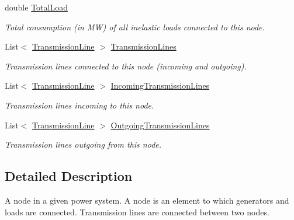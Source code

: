 \begin{DoxyCompactItemize}
double \hyperlink{class_power_system_planning_1_1_node_a5ad80ac9ed391e904c9cf4011c7ba00d}{Total\+Load}
\begin{DoxyCompactList}\small\item\em Total consumption (in MW) of all inelastic loads connected to this node. \end{DoxyCompactList}\item 
List$<$ \hyperlink{class_power_system_planning_1_1_transmission_line}{Transmission\+Line} $>$ \hyperlink{class_power_system_planning_1_1_node_a99a60d0b8c6efda899676fd86417162f}{Transmission\+Lines}
\begin{DoxyCompactList}\small\item\em Transmission lines connected to this node (incoming and outgoing). \end{DoxyCompactList}\item 
List$<$ \hyperlink{class_power_system_planning_1_1_transmission_line}{Transmission\+Line} $>$ \hyperlink{class_power_system_planning_1_1_node_a6b851f2b0cce15e7d245b40b43424a2d}{Incoming\+Transmission\+Lines}
\begin{DoxyCompactList}\small\item\em Transmission lines incoming to this node. \end{DoxyCompactList}\item 
List$<$ \hyperlink{class_power_system_planning_1_1_transmission_line}{Transmission\+Line} $>$ \hyperlink{class_power_system_planning_1_1_node_a125dc1d83ad828b71783bd1b2f77687a}{Outgoing\+Transmission\+Lines}
\begin{DoxyCompactList}\small\item\em Transmission lines outgoing from this node. \end{DoxyCompactList}\end{DoxyCompactItemize}


\subsection{Detailed Description}
A node in a given power system. A node is an element to which generators and loads are connected. Transmission lines are connected between two nodes. 



